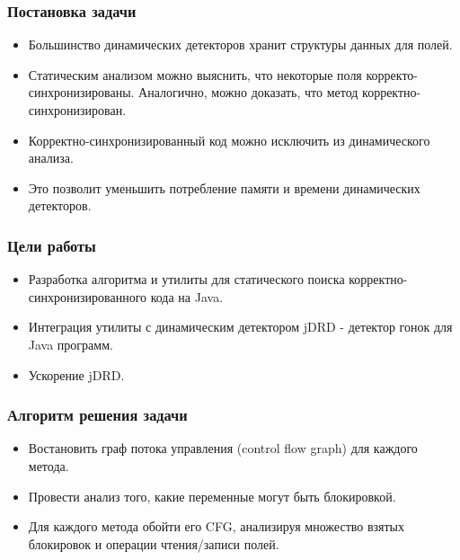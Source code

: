 \documentclass[t]{beamer}  %
\begin{document}
\begin{frame}[fragile]
  \frametitle{Постановка задачи}
\begin{itemize}
    \item Большинство динамических детекторов хранит структуры данных для полей.
    \item Статическим анализом можно выяснить, что некоторые поля корректо-синхронизированы. Аналогично, можно доказать, что метод корректно-синхронизирован. 
    \item Корректно-синхронизированный код можно исключить из динамического анализа.
    \item Это позволит уменьшить потребление памяти и времени динамических детекторов.
  \end{itemize}
\end{frame}

\begin{frame}[fragile]
  \frametitle{Цели работы}
  \vspace{0.5cm}  
\begin{itemize}
	\setlength\itemsep{1cm}
	\item Разработка алгоритма и утилиты для статического поиска корректно-синхронизированного кода на Java.
	\item Интеграция утилиты с динамическим детектором jDRD - детектор гонок для Java программ.
    	\item Ускорение jDRD. 

    \end{itemize}
\end{frame}



\begin{frame}[fragile]
  \frametitle{Алгоритм решения задачи}
  \vspace{0.5cm}  
\begin{itemize}
    \setlength\itemsep{1cm}
    \item Востановить граф потока управления (control flow graph) для каждого метода.

    \item Провести анализ того, какие переменные могут быть блокировкой. 

    \item Для каждого метода обойти его CFG, анализируя множество взятых блокировок и операции чтения/записи полей.
  \end{itemize}
\end{frame}
\end{document}
